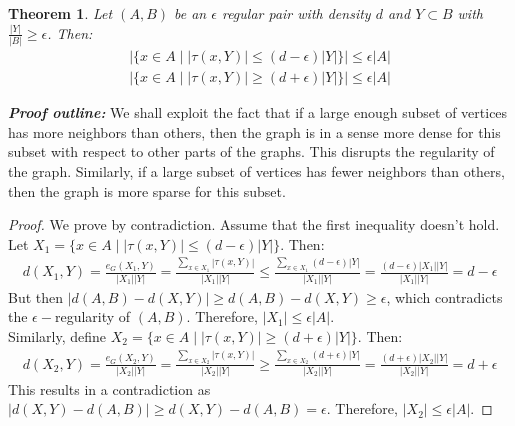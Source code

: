 \documentclass{article}
\newtheorem{theorem}{Theorem}[]
\begin{document}
\begin{theorem}
	Let $(A,B)$ be an $\epsilon$ regular pair with density $d$ and $Y\subset B$ with $\frac{|Y|}{|B|}\geq  \epsilon$. Then:
	\begin{align}
		|\{x\in A\mid|\tau(x,Y)|\leq  (d-\epsilon)|Y|\}|\leq \epsilon|A|\\
		|\{x\in A\mid|\tau(x,Y)|\geq  (d+\epsilon)|Y|\}|\leq \epsilon|A|
	\end{align} 
\end{theorem}\noindent
\textbf{\textit{Proof outline: 
}} We shall exploit the fact that if a large enough subset of vertices has more neighbors than others, then the graph is in a sense more dense for this subset with respect to other parts of the graphs. This disrupts the regularity of the graph. Similarly, if a large subset of vertices has fewer neighbors than others, then the graph is more sparse for this subset.
\begin{proof}
	We prove by contradiction. Assume that the first inequality doesn't hold. Let $X_1=\{x\in A\mid |\tau(x,Y)|\leq  (d-\epsilon)|Y|\}$. Then:
	\begin{align}
		d(X_1,Y)=\frac{e_G(X_1,Y)}{|X_1||Y|}=\frac{\sum_{x\in X_1}|\tau(x,Y)|}{|X_1||Y|}\leq  \frac{\sum_{x\in X_1}(d-\epsilon)|Y|}{|X_1||Y|}=\frac{(d-\epsilon)|X_1||Y|}{|X_1||Y|}=d-\epsilon
	\end{align}
	But then $|d(A,B)-d(X,Y)|\geq  d(A,B)-d(X,Y)\geq \epsilon$, which contradicts the $\epsilon-$regularity of $(A,B)$. Therefore, $|X_1|\leq  \epsilon|A|$.\\
	\noindent Similarly, define $X_2=\{x\in A\mid |\tau(x,Y)|\geq  (d+\epsilon)|Y|\}$. Then:
	\begin{align}
		d(X_2,Y)=\frac{e_G(X_2,Y)}{|X_2||Y|}=\frac{\sum_{x\in X_2}|\tau(x,Y)|}{|X_2||Y|}\geq  \frac{\sum_{x\in X_2}(d+\epsilon)|Y|}{|X_2||Y|}=\frac{(d+\epsilon)|X_2||Y|}{|X_2||Y|}=d+\epsilon
	\end{align}
	This results in a contradiction as $|d(X,Y)-d(A,B)|\geq  d(X,Y)-d(A,B)=\epsilon$. Therefore, $|X_2|\leq  \epsilon|A|$.
\end{proof}
\end{document}
